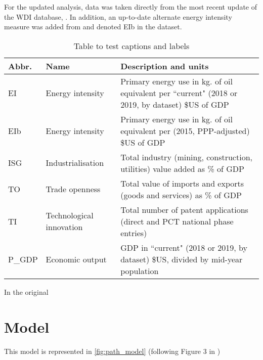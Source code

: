 \documentclass[11pt]{article}
\begin{document}
For the updated analysis, data was taken directly from the most recent update of the WDI database, \cite{theworldbankWorldDevelopmentIndicators2019}. In addition, an up-to-date alternate energy intensity measure was added from \cite{enerdataGlobalEnergyStatistical2019} and denoted EIb in the dataset.

\begin{table}[htbp]
\centering
\begin{tabulary}{\textwidth}{l l L} 
 Abbr. & Name & Description and units \\ [1ex] 
 \hline 
 EI & Energy intensity & Primary energy use in kg. of oil equivalent per ``current" (2018 or 2019, by dataset) \$US of GDP \\ 
 EIb & Energy intensity & Primary energy use in kg. of oil equivalent per (2015, PPP-adjusted) \$US of GDP \\ 
 ISG & Industrialisation & Total industry (mining, construction, utilities) value added as \% of GDP \\
 TO & Trade openness & Total value of imports and exports (goods and services) as \% of GDP \\ 
 TI & Technological innovation & Total number of patent applications (direct and PCT national phase entries) \\ 
 P\_GDP & Economic output & GDP in ``current" (2018 or 2019, by dataset) \$US, divided by mid-year population \\ 
\end{tabulary}
\caption{Table to test captions and labels}
\label{tab:data_source}
\end{table}

In the original 

\section{Model}

This model is represented in \cref{fig:path_model} (following Figure 3 in \cite{panHowIndustrializationTrade2019})
\end{document}
